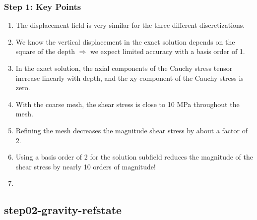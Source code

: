\documentclass[aspectratio=169]{beamer}
\begin{document}
\begin{frame}
  \frametitle{Step 1: Key Points}
  \summary{}

  \begin{enumerate}
  \item The displacement field is very similar for the three different discretizations.\pause
  \item We know the vertical displacement in the exact solution depends on the square of the depth $\Rightarrow$ we expect limited accuracy with a basis order of 1.\pause
  \item In the exact solution, the axial components of the Cauchy stress tensor increase linearly with depth, and the xy component of the Cauchy stress is zero.\pause
  \item With the coarse mesh, the shear stress is close to 10 MPa throughout the mesh.\pause
  \item Refining the mesh decreases the magnitude shear stress by about a factor of 2.\pause
  \item Using a basis order of 2 for the solution subfield reduces the magnitude of the shear stress by nearly 10 orders of magnitude!
  \item {}
  \end{enumerate}
  
\end{frame}


\subsection{step02-gravity-refstate}
\end{document}
